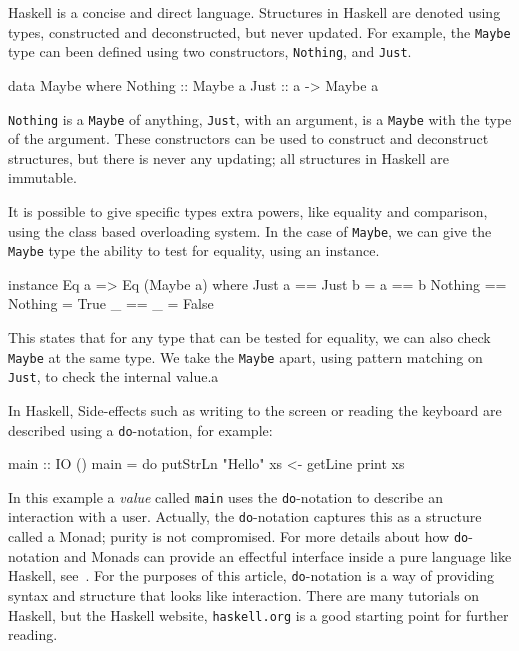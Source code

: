 \documentclass[11pt]{article}
\begin{document}
Haskell is a concise and direct language.
Structures in Haskell are denoted using types, constructed
and deconstructed, but never updated. For example, the \verb|Maybe| type
can been defined using two constructors, \verb|Nothing|, and \verb|Just|.
\begin{Code}
        
data Maybe where
  Nothing ::      Maybe a
  Just    :: a -> Maybe a

\end{Code}
\verb|Nothing| is a \verb|Maybe| of anything, \verb|Just|, with an argument,
is a \verb|Maybe| with the type of the argument. These constructors can be
used to construct and deconstruct structures, but there is never any updating;
all structures in Haskell are immutable.

It is possible to give specific types extra powers, like equality and comparison,
using the class based overloading system. In the case of \verb|Maybe|, we
can give the \verb|Maybe| type the ability to test for equality, using an
instance.
\begin{Code}
instance Eq a => Eq (Maybe a) where        
  Just a  == Just b  = a == b
  Nothing == Nothing = True
  _       == _       = False
\end{Code}

This states that for any type that can be tested for equality,
we can also check \verb|Maybe| at the same type. We take the \verb|Maybe|
apart, using pattern matching on \verb|Just|, to check the internal value.a

In Haskell, Side-effects such as writing to the screen
or reading the keyboard are described using a \verb|do|-notation, for example:

\begin{Code}

main :: IO ()
main = do
  putStrLn "Hello"
  xs <- getLine
  print xs

\end{Code}

In this example a {\em value\/} called \verb|main| uses the \verb|do|-notation to describe
an interaction with a user. Actually, the \verb|do|-notation captures
this as a structure called a Monad; purity is not compromised. For more details
about how \verb|do|-notation and Monads can provide an effectful interface
inside a pure language like Haskell, see~\cite{SPJ:93:IFP}. For the
purposes of this article, \verb|do|-notation is a way of providing syntax
and structure that looks like interaction. There are many tutorials
on Haskell, but the Haskell website, \verb|haskell.org| is a good starting point
for further reading.
\end{document}
